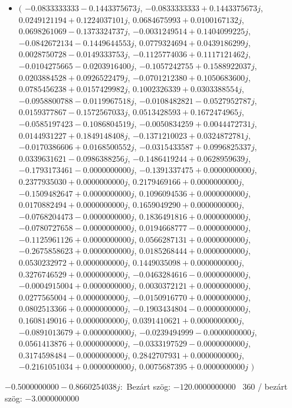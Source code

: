 \documentclass[14pt,a4paper]{article}
\begin{document}
\begin{itemize}
\item
$\big($
$-0.0833333333-0.1443375673j$, $-0.0833333333+0.1443375673j$, $0.0249121194+0.1224037101j$, $0.0684675993+0.0100167132j$, $0.0698261069-0.1373324737j$, $-0.0031249514+0.1404099225j$, $-0.0842672134-0.1449644553j$, $0.0779324694+0.0439186299j$, $0.0028750728-0.0149333753j$, $-0.1125774036+0.1117121462j$, $-0.0104275665-0.0203916400j$, $-0.1057242755+0.1588922037j$, $0.0203884528+0.0926522479j$, $-0.0701212380+0.1050683600j$, $0.0785456238+0.0157429982j$, $0.1002326339+0.0303388554j$, $-0.0958800788-0.0119967518j$, $-0.0108482821-0.0527952787j$, $0.0159377867-0.1572567033j$, $0.0513428593+0.1672474965j$, $-0.0585197423-0.1086804519j$, $-0.0050834259+0.0044472731j$, $0.0144931227+0.1849148408j$, $-0.1371210023+0.0324872781j$, $-0.0170386606+0.0168500552j$, $-0.0315433587+0.0996825337j$, $0.0339631621-0.0986388256j$, $-0.1486419244+0.0628959639j$, $-0.1793173461-0.0000000000j$, $-0.1391337475+0.0000000000j$, $0.2377935030+0.0000000000j$, $0.2179469166+0.0000000000j$, $-0.1509482647+0.0000000000j$, $0.1096094536+0.0000000000j$, $0.0170882494+0.0000000000j$, $0.1659049290+0.0000000000j$, $-0.0768204473-0.0000000000j$, $0.1836491816+0.0000000000j$, $-0.0780727658-0.0000000000j$, $0.0194668777-0.0000000000j$, $-0.1125961126+0.0000000000j$, $0.0566287131+0.0000000000j$, $-0.2675858623+0.0000000000j$, $0.0185268444+0.0000000000j$, $0.0530232972+0.0000000000j$, $0.1449035098+0.0000000000j$, $0.3276746529+0.0000000000j$, $-0.0463284616-0.0000000000j$, $-0.0004915004+0.0000000000j$, $0.0030372121+0.0000000000j$, $0.0277565004+0.0000000000j$, $-0.0150916770+0.0000000000j$, $0.0802513366+0.0000000000j$, $-0.1903434804-0.0000000000j$, $0.1608149016+0.0000000000j$, $0.0391410621+0.0000000000j$, $-0.0891013679+0.0000000000j$, $-0.0239494999-0.0000000000j$, $0.0561413876+0.0000000000j$, $-0.0333197529-0.0000000000j$, $0.3174598484-0.0000000000j$, $0.2842707931+0.0000000000j$, $-0.2161051034+0.0000000000j$, $0.0075687395+0.0000000000j$
$\big)$
\end{itemize}
$-0.5000000000-0.8660254038j$:\
Bezárt szög: $-120.0000000000$ \
360 / bezárt szög: $-3.0000000000$\
\end{document}
